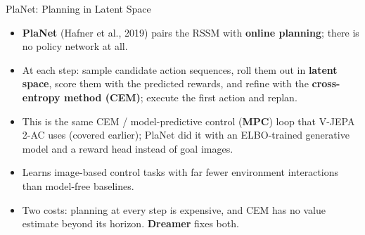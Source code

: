 \begin{frame}[t]{PlaNet: Planning in Latent Space}
  \begin{itemize}\itemsep0.28em
    \item \textbf{PlaNet} (Hafner et al., 2019) pairs the RSSM with \textbf{online planning}; there is no policy network at all.
    \item At each step: sample candidate action sequences, roll them out in \textbf{latent space}, score them with the predicted rewards, and refine with the \textbf{cross-entropy method (CEM)}; execute the first action and replan.
    \item This is the same CEM / model-predictive control (\textbf{MPC}) loop that V-JEPA 2-AC uses (covered earlier); PlaNet did it with an ELBO-trained generative model and a reward head instead of goal images.
    \item Learns image-based control tasks with far fewer environment interactions than model-free baselines.
    \item Two costs: planning at every step is expensive, and CEM has no value estimate beyond its horizon. \textbf{Dreamer} fixes both.
  \end{itemize}
\end{frame}
